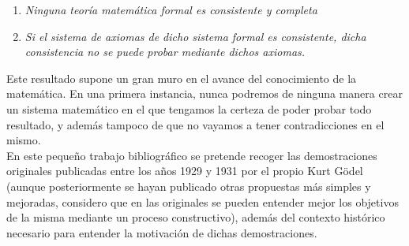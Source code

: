 \begin{center}
    \begin{enumerate}
        \item \textit{Ninguna teoría matemática formal es consistente y completa}
        \item \textit{Si el sistema de axiomas de dicho sistema formal es consistente, dicha consistencia no se puede probar mediante dichos axiomas.}
    \end{enumerate}
\end{center}

Este resultado supone un gran muro en el avance del conocimiento de la matemática. En una primera instancia, nunca podremos de ninguna manera
crear un sistema matemático en el que tengamos la certeza de poder probar todo resultado, y además tampoco de que no vayamos a tener contradicciones en el mismo.\\

En este pequeño trabajo bibliográfico se pretende recoger las demostraciones originales publicadas entre los años 1929 y 1931 por el propio Kurt Gödel (aunque 
posteriormente se hayan publicado otras propuestas más simples y mejoradas, considero que en las originales se pueden entender mejor los objetivos de la misma mediante
un proceso constructivo), además del contexto histórico necesario para entender la motivación de dichas demostraciones.


\endinput
